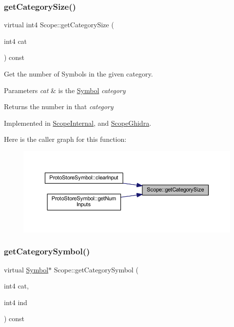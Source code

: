 \subsubsection{\texorpdfstring{getCategorySize()}{getCategorySize()}}
{\footnotesize\ttfamily virtual int4 Scope\+::get\+Category\+Size (\begin{DoxyParamCaption}\item[{int4}]{cat }\end{DoxyParamCaption}) const\hspace{0.3cm}{\ttfamily [pure virtual]}}



Get the number of Symbols in the given category. 


\begin{DoxyParams}{Parameters}
{\em cat} & is the \mbox{\hyperlink{class_symbol}{Symbol}} {\itshape category} \\
\hline
\end{DoxyParams}
\begin{DoxyReturn}{Returns}
the number in that {\itshape category} 
\end{DoxyReturn}


Implemented in \mbox{\hyperlink{class_scope_internal_a4ccbbc37afa4eee7c6cce98dbd3a5bff}{Scope\+Internal}}, and \mbox{\hyperlink{class_scope_ghidra_a4c6c26ca7dd639659313e8fe86d798c8}{Scope\+Ghidra}}.

Here is the caller graph for this function\+:
\nopagebreak
\begin{figure}[H]
\begin{center}
\leavevmode
\includegraphics[width=350pt]{class_scope_a909e15a7a96c9b402855b56b6bfdbd9f_icgraph}
\end{center}
\end{figure}
\mbox{\label{class_scope_a491a168d7ea71f00da419dd864901ccb}} 
\subsubsection{\texorpdfstring{getCategorySymbol()}{getCategorySymbol()}}
{\footnotesize\ttfamily virtual \mbox{\hyperlink{class_symbol}{Symbol}}$\ast$ Scope\+::get\+Category\+Symbol (\begin{DoxyParamCaption}\item[{int4}]{cat,  }\item[{int4}]{ind }\end{DoxyParamCaption}) const\hspace{0.3cm}{\ttfamily [pure virtual]}}



